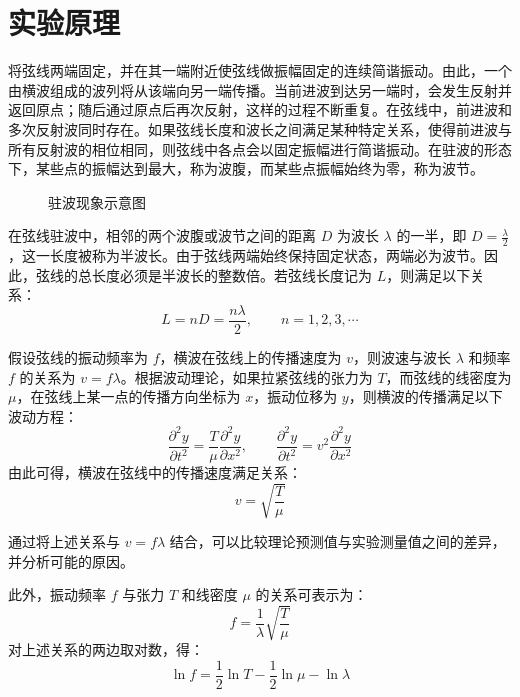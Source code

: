 \documentclass[UTF-8,twoside,cs4size]{ctexart}
\begin{document}
\section{实验原理}
将弦线两端固定，并在其一端附近使弦线做振幅固定的连续简谐振动。由此，一个由横波组成的波列将从该端向另一端传播。当前进波到达另一端时，会发生反射并返回原点；随后通过原点后再次反射，这样的过程不断重复。在弦线中，前进波和多次反射波同时存在。如果弦线长度和波长之间满足某种特定关系，使得前进波与所有反射波的相位相同，则弦线中各点会以固定振幅进行简谐振动。在驻波的形态下，某些点的振幅达到最大，称为波腹，而某些点振幅始终为零，称为波节。

\begin{figure}[!h]
    \centering
    \caption{驻波现象示意图}
\end{figure}

在弦线驻波中，相邻的两个波腹或波节之间的距离 $D$ 为波长 $\lambda$ 的一半，即 $D = \frac{\lambda}{2}$，这一长度被称为半波长。由于弦线两端始终保持固定状态，两端必为波节。因此，弦线的总长度必须是半波长的整数倍。若弦线长度记为 $L$，则满足以下关系：
\[
L = nD = \frac{n\lambda}{2}, \qquad n = 1, 2, 3, \cdots
\]

假设弦线的振动频率为 $f$，横波在弦线上的传播速度为 $v$，则波速与波长 $\lambda$ 和频率 $f$ 的关系为 $v = f\lambda$。根据波动理论，如果拉紧弦线的张力为 $T$，而弦线的线密度为 $\mu$，在弦线上某一点的传播方向坐标为 $x$，振动位移为 $y$，则横波的传播满足以下波动方程：
\[
\frac{\partial^2 y}{\partial t^2} = \frac{T}{\mu} \frac{\partial^2 y}{\partial x^2}, \qquad \frac{\partial^2 y}{\partial t^2} = v^2 \frac{\partial^2 y}{\partial x^2}
\]
由此可得，横波在弦线中的传播速度满足关系：
\[
v = \sqrt{\frac{T}{\mu}}
\]

通过将上述关系与 $v=f\lambda$ 结合，可以比较理论预测值与实验测量值之间的差异，并分析可能的原因。

此外，振动频率 $f$ 与张力 $T$ 和线密度 $\mu$ 的关系可表示为：
\[
f = \frac{1}{\lambda} \sqrt{\frac{T}{\mu}}
\]
对上述关系的两边取对数，得：
\[
\ln f = \frac{1}{2} \ln T - \frac{1}{2} \ln \mu - \ln \lambda
\]
\end{document}
